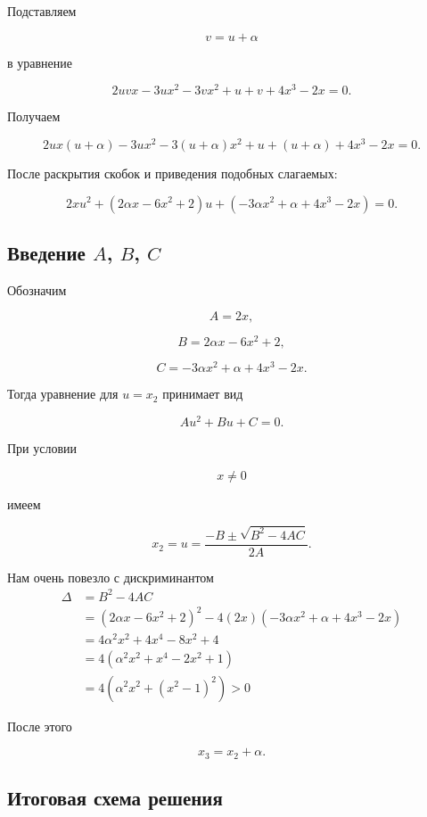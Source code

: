 \documentclass[12pt,a4paper]{article}
\begin{document}
	Подставляем
	
	$$
	v=u+\alpha
	$$
	
	в уравнение
	
	$$
	2uvx
	-3ux^2
	-3vx^2
	+u+v
	+4x^3-2x=0.
	$$
	
	Получаем
	
	$$
	2ux(u+\alpha)
	-3ux^2
	-3(u+\alpha)x^2
	+u+(u+\alpha)
	+4x^3-2x=0.
	$$
	
	После раскрытия скобок и приведения подобных слагаемых:
	
	$$
	\boxed{
		2xu^2
		+
		\left(
		2\alpha x-6x^2+2
		\right)u
		+
		\left(
		-3\alpha x^2+\alpha+4x^3-2x
		\right)
		=0.
	}
	$$
	
	\subsection{Введение $A$, $B$, $C$}
	
	Обозначим
	
	$$
	\boxed{
		A=2x,
	}
	$$
	
	$$
	\boxed{
		B=
		2\alpha x-6x^2+2,
	}
	$$
	
	$$
	\boxed{
		C=
		-3\alpha x^2+\alpha+4x^3-2x.
	}
	$$
	
	Тогда уравнение для $u=x_2$ принимает вид
	
	$$
	\boxed{
		Au^2+Bu+C=0.
	}
	$$
	
	При условии
	
	$$
	x\ne0
	$$
	
	имеем
	
	$$
	\boxed{
		x_2=u=
		\frac{-B\pm\sqrt{B^2-4AC}}{2A}.
	}
	$$
	
	\noindent Нам очень повезло с дискриминантом
	\[
	\begin{aligned}
		\Delta
		&=B^2-4AC\\
		&=\left(2\alpha x-6x^2+2\right)^2
		-4(2x)\left(-3\alpha x^2+\alpha+4x^3-2x\right)
		\\[2mm]
		&=4\alpha^2x^2+4x^4-8x^2+4
		\\[2mm]
		&=4\left(\alpha^2x^2+x^4-2x^2+1\right)
		\\[2mm]
		&=4\left(\alpha^2x^2+(x^2-1)^2\right) > 0
	\end{aligned}
	\]
	

	
	После этого
	
	$$
	\boxed{
		x_3=x_2+\alpha.
	}
	$$
	
	

	
	\subsection{Итоговая схема решения}
	
\end{document}
